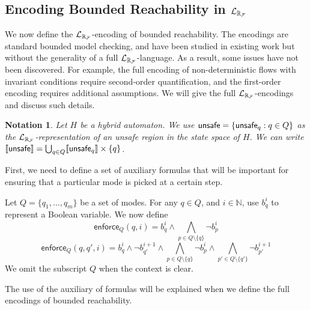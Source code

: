 \documentclass[10pt,envcountsect]{llncs}
\newtheorem{notation}[theorem]{Notation}
\newcommand{\enforce}{\mathsf{enforce}}
\begin{document}
\subsection{Encoding Bounded Reachability in $\mathcal{L}_{\mathbb{R}_{\mathcal{F}}}$}
We now define the $\mathcal{L}_{\mathbb{R}_{\mathcal{F}}}$-encoding of bounded reachability. The encodings are standard bounded model checking, and have been studied in existing work but without the generality of a full $\mathcal{L}_{\mathbb{R}_{\mathcal{F}}}$-language. As a result, some issues have not been discovered. For example, the full encoding of non-deterministic flows with invariant conditions require second-order quantification, and the first-order encoding requires additional assumptions. We will give the full $\mathcal{L}_{\mathbb{R}_{\mathcal{F}}}$-encodings and discuss such details.
\begin{notation}
Let $H$ be a hybrid automaton. We use $\mathsf{unsafe} = \{\mathsf{unsafe}_q:q\in Q\}$ as the $\mathcal{L}_{\mathbb{R}_{\mathcal{F}}}$-representation of an unsafe region in the state space of $H$. We can write $\llbracket \mathsf{unsafe}\rrbracket = \bigcup_{q\in Q} \llbracket \mathsf{unsafe}_q \rrbracket\times \{q\}$.
\end{notation}
First, we need to define a set of auxiliary formulas that will be important for ensuring that a particular mode is picked at a certain step.
\begin{definition}
Let $Q = \{q_1,...,q_m\}$ be a set of modes. For any $q\in Q$, and $i\in\mathbb{N}$, use  $b_{q}^i$ to represent a Boolean variable. We now define
$$\enforce_Q(q,i) = b^i_{q} \wedge \bigwedge_{p\in Q\setminus\{q\}}\neg b^{i}_{p}$$
$$\enforce_Q(q, q',i) = b^{i}_{q}\wedge \neg b^{i+1}_{q'} \wedge \bigwedge_{p\in Q\setminus\{q\}} \neg b^i_{p} \wedge \bigwedge_{p'\in Q\setminus\{q'\}} \neg b^{i+1}_{p'}$$
We omit the subscript $Q$ when the context is clear.\end{definition}
The use of the auxiliary of formulas will be explained when we define the full encodings of bounded reachability.
\end{document}
